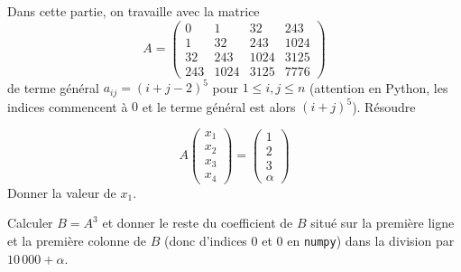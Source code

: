 
Dans cette partie, on travaille avec la matrice
\begin{equation*}
A=  \begin{pmatrix}
  0 & 1 & 32 & 243\\
  1 & 32 & 243 & 1024\\
  32 & 243 & 1024 & 3125\\
  243 & 1024 & 3125 & 7776
  \end{pmatrix}
\end{equation*}
de terme général $a_{ij}=(i+j-2)^{5}$ pour $1\leq i,j\leq n$
(attention en Python, les indices commencent à $0$ et le terme général
est alors $(i+j)^{5}$).
\question{} Résoudre

  \begin{equation*}
    A
    \begin{pmatrix}
      x_{1}\\x_{2}\\x_{3}\\x_{4}
    \end{pmatrix}
    =
    \begin{pmatrix}
      1\\ 2\\ 3\\ \alpha
    \end{pmatrix}
  \end{equation*}
  Donner la valeur de $x_{1}$.


\question{}
  Calculer $B = A^{3}$ et donner le reste du coefficient de $B$ situé
  sur la première ligne et la première colonne de $B$ (donc d'indices
  $0$ et $0$ en \texttt{numpy}) dans la division par $10\,000+\alpha$.


